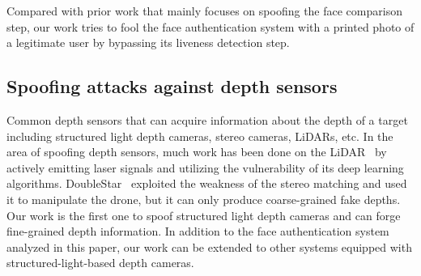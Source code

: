 Compared with prior work that mainly focuses on spoofing the face comparison step, our work tries to fool the face authentication system with a printed photo of a legitimate user by bypassing its liveness detection step.


\subsection{Spoofing attacks against depth sensors} 
Common depth sensors that can acquire information about the depth of a target including structured light depth cameras,  stereo cameras, LiDARs, etc.
In the area of spoofing depth sensors, much work has been done on the LiDAR~\cite{cao2019adversarial, sun2020towards, tu2020physically} by actively emitting laser signals and utilizing the vulnerability of its deep learning algorithms.
DoubleStar~\cite{277102} exploited the weakness of the stereo matching and used it to manipulate the drone, but it can only produce coarse-grained fake depths. 
Our work is the first one to spoof structured light depth cameras and can forge fine-grained depth information. In addition to the face authentication system analyzed in this paper, our work can be extended to other systems equipped with structured-light-based depth cameras.